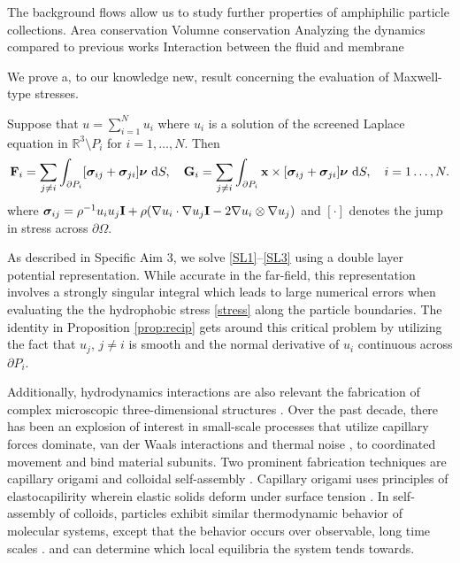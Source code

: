The background flows allow us to study further properties of amphiphilic particle collections. 
Area conservation
Volumne conservation
Analyzing the dynamics compared to previous works
Interaction between the fluid and membrane 

We prove a, to our knowledge new, result concerning the evaluation of Maxwell-type stresses. 
\begin{proposition}
  \label{prop:recip}
  Suppose that $u = \sum_{i=1}^N u_i$ where $u_i$ is a solution of the screened Laplace equation
  in $\mathbb{R}^3 \setminus P_i$ for $i=1,\dots, N.$ Then 
\begin{equation}
{\bf F}_i = \sum_{j \neq i} \int_{\partial P_i}[\boldsymbol{\sigma}_{ij} + \boldsymbol{\sigma}_{ji}]\boldsymbol{\nu}\,\dif S,\quad
{\bf G}_i = \sum_{j \neq i} \int_{\partial P_i} {\bf x} \times [\boldsymbol{\sigma}_{ij} + \boldsymbol{\sigma}_{ji}]\boldsymbol{\nu}\,\dif S, \quad i = 1\dots, N.
\end{equation}
where $\boldsymbol{\sigma}_{ij} = \rho^{-1} u_iu_j {\bf I} + \rho(\nabla u_i \cdot \nabla u_j {\bf I} - 2 \nabla u_i \otimes \nabla u_j)$ and
$[\cdot]$ denotes the jump in stress across $\partial \Omega.$ 
\end{proposition}
As described in Specific Aim 3, we solve \eqref{SL1}--\eqref{SL3}  using a double layer potential representation.
While accurate in the far-field, this representation involves a strongly singular integral which
leads to large numerical errors when evaluating the the hydrophobic stress \eqref{stress} along the particle boundaries.
The identity in Proposition \ref{prop:recip} gets around this critical problem by utilizing the fact that $u_j$, $j\neq i$ is smooth and the normal derivative
of  $u_i$ continuous across $\partial P_i$.

Additionally, hydrodynamics interactions are also relevant the fabrication of complex microscopic three-dimensional structures \cite{Cho2010}.
Over the past decade, there has been an explosion of interest in small-scale processes that utilize capillary forces dominate,  van der Waals interactions and thermal noise  \cite{Zhang2017}, to coordinated movement and bind  material subunits. Two prominent fabrication techniques are capillary origami 
\cite{Pandey2011,Leong2007,Reynolds2019} and colloidal self-assembly \cite{Dasgupta2017,Siontorou2017}. Capillary origami uses principles of elastocapilirity wherein elastic solids deform under surface tension \cite{Bico2018,VanHonschoten2010}. In self-assembly of colloids, 
particles exhibit similar thermodynamic behavior of molecular systems, except that the behavior occurs over observable, long time scales \cite{Zhang2017}. 
and can determine which local equilibria the system tends towards.



